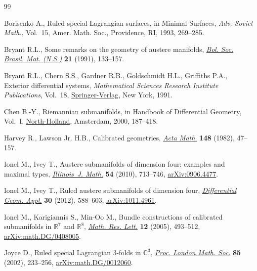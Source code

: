 \begin{thebibliography}{99}
\footnotesize\itemsep=0pt

Borisenko A., Ruled special {L}agrangian surfaces, in Minimal Surfaces,
 \textit{Adv. Soviet Math.}, Vol.~15, Amer. Math. Soc., Providence, RI, 1993,
 269--285.

Bryant R.L., Some remarks on the geometry of austere manifolds, \href{https://doi.org/10.1007/BF01237361}{\textit{Bol.
 Soc. Brasil. Mat. (N.S.)}} \textbf{21} (1991), 133--157.

Bryant R.L., Chern S.S., Gardner R.B., Goldschmidt H.L., Griffiths P.A.,
 Exterior differential systems, \textit{Mathematical Sciences Research
 Institute Publications}, Vol.~18, \href{https://doi.org/10.1007/978-1-4613-9714-4}{Springer-Verlag}, New York, 1991.

Chen B.-Y., Riemannian submanifolds, in Handbook of Differential Geometry,
 {V}ol.~{I}, \href{https://doi.org/10.1016/S1874-5741(00)80006-0}{North-Holland}, Amsterdam, 2000, 187--418.

Harvey R., Lawson Jr. H.B., Calibrated geometries, \href{https://doi.org/10.1007/BF02392726}{\textit{Acta Math.}}
 \textbf{148} (1982), 47--157.

Ionel M., Ivey T., Austere submanifolds of dimension four: examples and maximal
 types, \href{https://doi.org/10.1215/ijm/1318598678}{\textit{Illinois~J. Math.}} \textbf{54} (2010), 713--746,
 \href{https://arxiv.org/abs/0906.4477}{arXiv:0906.4477}.

Ionel M., Ivey T., Ruled austere submanifolds of dimension four,
 \href{https://doi.org/10.1016/j.difgeo.2012.07.007}{\textit{Differential Geom. Appl.}} \textbf{30} (2012), 588--603,
 \href{https://arxiv.org/abs/1011.4961}{arXiv:1011.4961}.

Ionel M., Karigiannis S., Min-Oo M., Bundle constructions of calibrated
 submanifolds in {${\mathbb R}^7$} and {${\mathbb R}^8$}, \href{https://doi.org/10.4310/MRL.2005.v12.n4.a5}{\textit{Math. Res.
 Lett.}} \textbf{12} (2005), 493--512, \href{https://arxiv.org/abs/math.DG/0408005}{arXiv:math.DG/0408005}.

Joyce D., Ruled special {L}agrangian 3-folds in {$\mathbb C^3$}, \href{https://doi.org/10.1112/S0024611502013485}{\textit{Proc.
 London Math. Soc.}} \textbf{85} (2002), 233--256, \href{https://arxiv.org/abs/math.DG/0012060}{arXiv:math.DG/0012060}.


\end{thebibliography}
